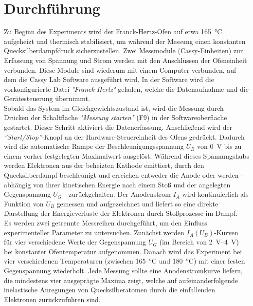 \section{Durchführung}

Zu Beginn des Experiments wird der Franck-Hertz-Ofen auf etwa \SI{165}{\celsius} aufgeheizt und thermisch stabilisiert, um während der Messung einen konstanten Quecksilberdampfdruck sicherzustellen. Zwei Messmodule (Cassy-Einheiten) zur Erfassung von Spannung und Strom werden mit den Anschlüssen der Ofeneinheit verbunden. Diese Module sind wiederum mit einem Computer verbunden, auf dem die Cassy Lab Software ausgeführt wird. In der Software wird die vorkonfigurierte Datei \textit{"Franck Hertz"} geladen, welche die Datenaufnahme und die Gerätesteuerung übernimmt.
\vspace{0.3cm}\\
Sobald das System im Gleichgewichtszustand ist, wird die Messung durch Drücken der Schaltfläche \textit{"Messung starten"} (F9) in der Softwareoberfläche gestartet. Dieser Schritt aktiviert die Datenerfassung. Anschließend wird der \textit{''Start/Stop''}-Knopf an der Hardware-Steuereinheit des Ofens gedrückt. Dadurch wird die automatische Rampe der Beschleunigungsspannung $U_B$ von \SI{0}{\volt} bis zu einem vorher festgelegten Maximalwert ausgelöst. Während dieses Spannungshubs werden Elektronen aus der beheizten Kathode emittiert, durch den Quecksilberdampf beschleunigt und erreichen entweder die Anode oder werden - abhängig von ihrer kinetischen Energie nach einem Stoß und der angelegten Gegenspannung $U_G$ - zurückgehalten. Der Anodenstrom $I_A$ wird kontinuierlich als Funktion von $U_B$ gemessen und aufgezeichnet und liefert so eine direkte Darstellung der Energieverluste der Elektronen durch Stoßprozesse im Dampf.
\vspace{0.3cm}\\
Es werden zwei getrennte Messreihen durchgeführt, um den Einfluss experimenteller Parameter zu untersuchen. Zunächst werden $I_A(U_B)$-Kurven für vier verschiedene Werte der Gegenspannung $U_G$ (im Bereich von \SIrange{2}{4}{\volt}) bei konstanter Ofentemperatur aufgenommen. Danach wird das Experiment bei vier verschiedenen Temperaturen (zwischen \SI{165}{\celsius} und \SI{180}{\celsius}) mit einer festen Gegenspannung wiederholt. Jede Messung sollte eine Anodenstromkurve liefern, die mindestens vier ausgeprägte Maxima zeigt, welche auf aufeinanderfolgende inelastische Anregungen von Quecksilberatomen durch die einfallenden Elektronen zurückzuführen sind.
\vspace{0.3cm}\\
